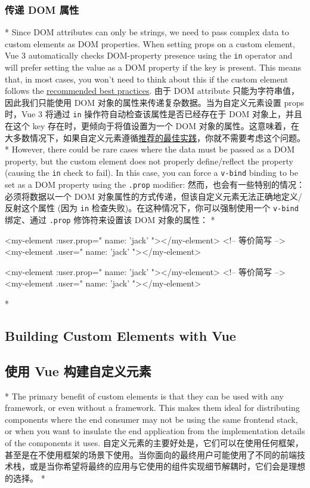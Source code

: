\begin{paracol}{2}
\subsubsection{传递 DOM 属性}
\switchcolumn[0]*%
Since DOM attributes can only be strings, we need to pass complex data
to custom elements as DOM properties. When setting props on a custom
element, Vue 3 automatically checks DOM-property presence using the
\texttt{in} operator and will prefer setting the value as a DOM property
if the key is present. This means that, in most cases, you won't need to
think about this if the custom element follows the
\href{https://web.dev/custom-elements-best-practices/}{recommended best
practices}.
\switchcolumn
由于 DOM attribute 只能为字符串值，因此我们只能使用 DOM
对象的属性来传递复杂数据。当为自定义元素设置 props 时，Vue 3 将通过
\texttt{in} 操作符自动检查该属性是否已经存在于 DOM 对象上，并且在这个
key 存在时，更倾向于将值设置为一个 DOM
对象的属性。这意味着，在大多数情况下，如果自定义元素遵循\href{https://web.dev/custom-elements-best-practices/}{推荐的最佳实践}，你就不需要考虑这个问题。
\switchcolumn[0]*%
However, there could be rare cases where the data must be passed as a
DOM property, but the custom element does not properly define/reflect
the property (causing the \texttt{in} check to fail). In this case, you
can force a \texttt{v-bind} binding to be set as a DOM property using
the \texttt{.prop} modifier:
\switchcolumn
然而，也会有一些特别的情况：必须将数据以一个 DOM
对象属性的方式传递，但该自定义元素无法正确地定义/反射这个属性 (因为
\texttt{in} 检查失败)。在这种情况下，你可以强制使用一个 \texttt{v-bind}
绑定、通过 \texttt{.prop} 修饰符来设置该 DOM 对象的属性：
\switchcolumn[0]*%
\begin{codeHtml}
<my-element :user.prop="{ name: 'jack' }"></my-element>
<!-- 等价简写 -->
<my-element .user="{ name: 'jack' }"></my-element>
\end{codeHtml}
\switchcolumn
\begin{codeHtml}
<my-element :user.prop="{ name: 'jack' }"></my-element>
<!-- 等价简写 -->
<my-element .user="{ name: 'jack' }"></my-element>
\end{codeHtml}
\switchcolumn[0]*%
\subsection{Building Custom Elements with Vue}
\switchcolumn
\subsection{使用 Vue 构建自定义元素}
\switchcolumn[0]*%
The primary benefit of custom elements is that they can be used with any
framework, or even without a framework. This makes them ideal for
distributing components where the end consumer may not be using the same
frontend stack, or when you want to insulate the end application from
the implementation details of the components it uses.
\switchcolumn
自定义元素的主要好处是，它们可以在使用任何框架，甚至是在不使用框架的场景下使用。当你面向的最终用户可能使用了不同的前端技术栈，或是当你希望将最终的应用与它使用的组件实现细节解耦时，它们会是理想的选择。
\switchcolumn[0]*%

\end{paracol}
